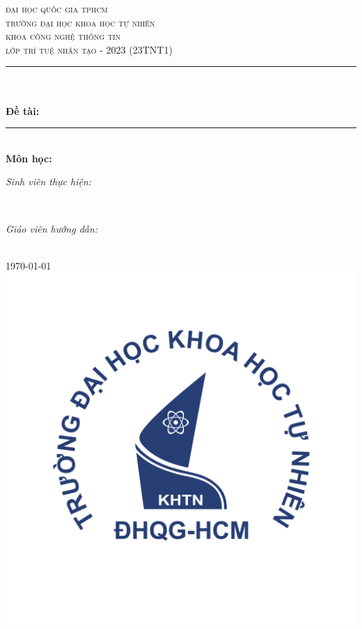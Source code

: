 \begin{titlepage}
\newcommand{\HRule}{\rule{\linewidth}{0.5mm}}
\centering

\textsc{\LARGE đại học quốc gia tphcm}\\[1.5cm]
\textsc{\Large trường đại học khoa học tự nhiên}\\[0.5cm]
\textsc{\large khoa công nghệ thông tin}\\[0.5cm]
\textsc{lớp trí tuệ nhân tạo - 2023 (23TNT1)}\\[0.5cm]

\HRule \\[0.4cm]
{ 
\huge{\bfseries{\reporttitle}}\\[0.5cm]
\large{\bfseries{Đề tài: \reportname}}
}\\[0.4cm]
\HRule \\[0.5cm]

\textbf{\large Môn học: \coursename}\\[0.5cm]

\begin{minipage}[t]{0.5\textwidth}
\begin{flushleft} \large
\emph{Sinh viên thực hiện:}\\
\studentname
\end{flushleft}
\end{minipage}
~
\begin{minipage}[t]{0.4\textwidth}
\begin{flushright} \large
\emph{Giáo viên hướng dẫn:} \\
\teachername
\end{flushright}
\end{minipage}\\[2cm]

{\large \today}\\[1cm]

\includegraphics[scale=.25]{img/hcmus-logo.png}\\[1cm] 

\vfill
\end{titlepage}
	